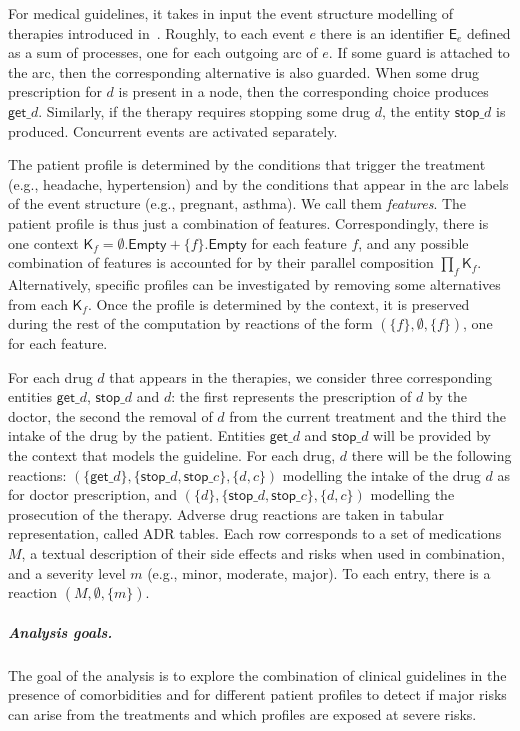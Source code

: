 For medical guidelines, it takes in input the event structure modelling of therapies introduced in~\cite{BC17c}. Roughly, to each event $e$ there is an identifier $\mathsf{E}_e$ defined as a sum of processes, one for each outgoing arc of $e$. If some guard is attached to the arc, then the corresponding alternative is also guarded. When some drug prescription for $d$ is present in a node, then the corresponding choice produces $\mathsf{get}\_d$. Similarly, if the therapy requires stopping some drug $d$, the entity $\mathsf{stop}\_d$ is produced.
Concurrent events are activated separately. 

The patient profile is determined by the conditions that trigger the treatment (e.g., headache, hypertension) and by the conditions that appear in the arc labels of the event structure (e.g., pregnant, asthma). We call them \emph{features}. The patient profile is thus just a combination of features. Correspondingly, there is one context $\mathsf{K}_f = \emptyset.\mathsf{Empty} + \{f\}.\mathsf{Empty}$ for each feature $f$, and any possible combination of features is accounted for by their parallel composition $\prod_f \mathsf{K}_f$. Alternatively, specific profiles can be investigated by removing some alternatives from each $\mathsf{K}_f$.
Once the profile is determined by the context, it is preserved during the rest of the computation by reactions of the form $(\{f\},\emptyset,\{f\})$, one for each feature.

For each drug $d$ that appears in the therapies, we consider three corresponding entities $\mathsf{get}\_d$, $\mathsf{stop}\_d$  and $d$: the first represents the prescription of $d$ by the doctor, the second the removal of $d$ from the current treatment and the third the intake of the drug by the patient. 
Entities $\mathsf{get}\_d$ and $\mathsf{stop}\_d$ will be provided by the context that models the guideline. 
For each drug, $d$ there will be the following reactions: $(\{\mathsf{get}\_d\},\{\mathsf{stop}\_d,\mathsf{stop}\_c\},\{d,c\})$ modelling the intake of the drug $d$ as for doctor prescription, and $(\{d\},\{\mathsf{stop}\_d,\mathsf{stop}\_c\},\{d,c\})$ modelling the prosecution of the therapy. 
Adverse drug reactions are taken in tabular representation, called ADR tables.
Each row corresponds to a set of medications $M$, a textual description of their side effects and risks when used in combination, and a severity level $m$ (e.g., minor, moderate, major).
To each entry, there is a reaction $(M,\emptyset,\{m\})$. 

\subparagraph*{Analysis goals.}
The goal of the analysis is to explore the combination of clinical guidelines in the presence of comorbidities and for different patient profiles to detect if major risks can arise from the treatments and which profiles are exposed at severe risks.

